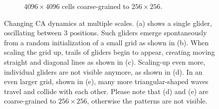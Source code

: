 \begin{figure}[ht]
\begin{subfigure}{.48\linewidth}
    \caption{\label{subfig:waves_c} $4096 \times 4096$ cells coarse-grained to $256 \times 256$.}
  \end{subfigure}
  \caption{\label{fig:dynamics_levels} Changing CA dynamics at multiple scales.
    (a) shows a single glider, oscillating between 3 positions. Such gliders
    emerge spontaneously from a random initialization of a small grid as shown
    in (b). When scaling the grid up, trails of gliders begin to appear,
    creating moving straight and diagonal lines as shown in (c). Scaling-up even
    more, individual gliders are not visible anymore, as shown in (d). In an
    even larger grid, shown in (e), many more triangular-shaped waves travel and
    collide with each other. Please note that (d) and (e) are coarse-grained to
    $256 \times 256$, otherwise the patterns are not visible.}
\end{figure}


